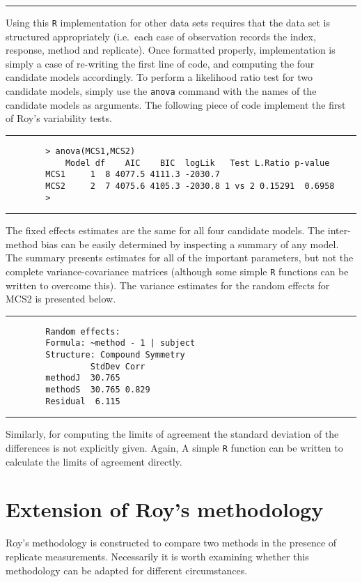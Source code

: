 \documentclass[12pt, a4paper]{article}
\theoremstyle{plain}
\theoremstyle{definition}
\theoremstyle{remark}
\begin{document}
\hrule
\vspace{1cm}
Using this \texttt{R} implementation for other data sets requires that the data set is structured appropriately (i.e.\ each case of observation records the index, response, method and replicate). Once formatted properly, implementation is simply a case of re-writing the first line of code, and computing the four candidate models accordingly.
\newpage
To perform a likelihood ratio test for two candidate models, simply use the \texttt{anova} command with the names of the candidate models as arguments. The following piece of code implement the first of Roy's variability tests.
\\
\hrule
\begin{verbatim}
        > anova(MCS1,MCS2)
            Model df    AIC    BIC  logLik   Test L.Ratio p-value
        MCS1     1  8 4077.5 4111.3 -2030.7
        MCS2     2  7 4075.6 4105.3 -2030.8 1 vs 2 0.15291  0.6958
        >
\end{verbatim}
\hrule
\vspace{1cm}
The fixed effects estimates are the same for all four candidate models. The inter-method bias can be easily determined by inspecting a summary of any model. The summary presents estimates for all of the important parameters, but not the complete variance-covariance matrices (although some simple \texttt{R} functions can be written to overcome this). The variance estimates for the random effects for MCS2 is presented below.
\\
\hrule
\begin{verbatim}
        Random effects:
        Formula: ~method - 1 | subject
        Structure: Compound Symmetry
                 StdDev Corr
        methodJ  30.765
        methodS  30.765 0.829
        Residual  6.115
\end{verbatim}
\hrule
\vspace{1cm}
Similarly, for computing the limits of agreement the standard deviation of the differences is not explicitly given. Again, A simple \texttt{R} function can be written to calculate the limits of agreement directly.

\newpage
\section{Extension of Roy's methodology}
Roy's methodology is constructed to compare two methods in the presence of replicate measurements. Necessarily it is worth examining whether this methodology can be adapted for different circumstances.
\end{document}
